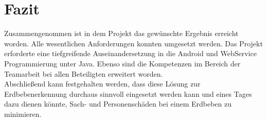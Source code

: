\section{Fazit}
Zusammengenommen ist in dem Projekt das gewünschte Ergebnis erreicht worden. Alle wesentlichen Anforderungen konnten umgesetzt werden. Das Projekt erforderte eine tiefgreifende Auseinandersetzung in die Android und WebService Programmierung unter Java. Ebenso sind die Kompetenzen im Bereich der Teamarbeit bei allen Beteiligten erweitert worden.\\
Abschließend kann festgehalten werden, dass diese Lösung zur Erdbebenerkennung durchaus sinnvoll eingesetzt werden kann und eines Tages dazu dienen könnte, Sach- und Personenschäden bei einem Erdbeben zu minimieren.